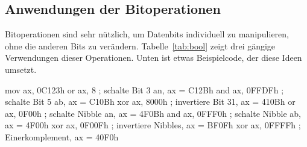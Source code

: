 
\subsection{Anwendungen der Bitoperationen }

Bitoperationen sind sehr n\"{u}tzlich, um Datenbits individuell zu
manipulieren, ohne die anderen Bits zu ver\"{a}ndern.
Tabelle~\ref{tab:bool} zeigt drei g\"{a}ngige Verwendungen dieser
Operationen. Unten ist etwas Beispielcode, der diese Ideen umsetzt.
\begin{AsmCodeListing}[frame=none, numbers=left]
      mov    ax, 0C123h
      or     ax, 8            ; schalte Bit 3 an,    ax = C12Bh
      and    ax, 0FFDFh       ; schalte Bit 5 ab,    ax = C10Bh
      xor    ax, 8000h        ; invertiere Bit 31,   ax = 410Bh
      or     ax, 0F00h        ; schalte Nibble an,   ax = 4F0Bh
      and    ax, 0FFF0h       ; schalte Nibble ab,   ax = 4F00h
      xor    ax, 0F00Fh       ; invertiere Nibbles,  ax = BF0Fh
      xor    ax, 0FFFFh       ; Einerkomplement,     ax = 40F0h
\end{AsmCodeListing}

